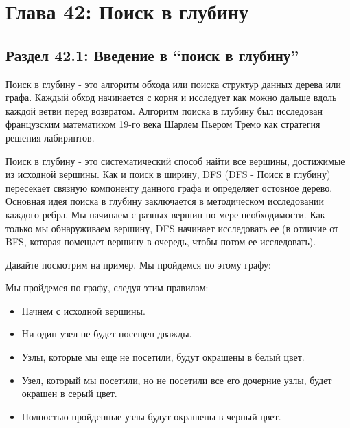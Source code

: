 \chapter*{Глава 42: Поиск в глубину}
\section*{Раздел 42.1: Введение в “поиск в глубину”}

\href{https://vk.cc/9qUJs2}{\underline{Поиск в глубину}} - это алгоритм обхода или поиска структур данных дерева или графа. Каждый обход начинается с корня и исследует как можно дальше вдоль каждой ветви перед возвратом. Алгоритм поиска в глубину был исследован французским математиком 19-го века Шарлем Пьером Тремо как стратегия решения лабиринтов.

\vspace{\baselineskip}

Поиск в глубину - это систематический способ найти все вершины, достижимые из исходной вершины. Как и поиск в ширину, DFS (DFS - Поиск в глубину) пересекает связную компоненту данного графа и определяет остовное дерево. Основная идея поиска в глубину заключается в методическом исследовании каждого ребра. Мы начинаем с разных вершин по мере необходимости. Как только мы обнаруживаем вершину, DFS начинает исследовать ее (в отличие от BFS, которая помещает вершину в очередь, чтобы потом ее исследовать).

\vspace{\baselineskip}

Давайте посмотрим на пример. Мы пройдемся по этому графу:

\begin{center}
\end{center}

Мы пройдемся по графу, следуя этим правилам:

\begin{itemize}
    \item Начнем с исходной вершины.
    \item Ни один узел не будет посещен дважды.
    \item Узлы, которые мы еще не посетили, будут окрашены в белый цвет.
    \item Узел, который мы посетили, но не посетили все его дочерние узлы, будет окрашен в серый цвет.
    \item Полностью пройденные узлы будут окрашены в черный цвет.
\end{itemize}

